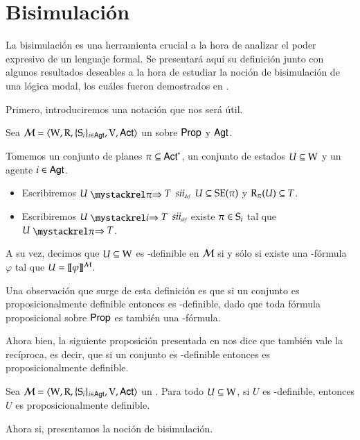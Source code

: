 \section{Bisimulación}

La bisimulación es una herramienta crucial a la hora de analizar el poder expresivo de un lenguaje formal. Se presentará aquí su definición junto con algunos resultados 
deseables a la hora de estudiar la noción de bisimulación de una lógica modal, los cuáles fueron demostrados en \cite{ArecesFSV25}.

Primero, introduciremos una notación que nos será útil.

\begin{definicion}
    Sea $\model=\tup{\W,\R,\cset{\S_i}_{i \in \AGT},\V,\ACT}$ un \ults sobre $\PROP$ y $\AGT$.

    Tomemos un conjunto de planes $\pi \subseteq \ACT^*$, un conjunto de estados $U \subseteq \W$ y un agente $i \in \AGT$.
    \begin{itemize}
        \item Escribiremos $U \ultsExecStrat{\pi} T$ $\iffdef$ $U \subseteq \sexec(\pi)$ y $\R_\pi(U) \subseteq T$.
        \item Escribiremos $U \ultsExecAgi T$ $\iffdef$ existe $\pi \in \S_i$ tal que $U \ultsExecStrat{\pi} T$.
    \end{itemize}
    A su vez, decimos que $U \subseteq \W$ es \KHilogic-definible en $\modults$ si y sólo si existe una \KHilogic-fórmula $\varphi$ tal que
    $U = \truthset{\modults}{\varphi}$.
\end{definicion}

Una observación que surge de esta definición es que si un conjunto es proposicionalmente definible entonces es \KHilogic-definible, dado que 
toda fórmula proposicional sobre $\PROP$ es también una \KHilogic-fórmula.

Ahora bien, la siguiente proposición presentada en \cite{ArecesFSV25} nos dice que también vale la recíproca, 
es decir, que si un conjunto es \KHilogic-definible entonces es proposicionalmente definible.

\begin{proposicion}\label{ref:khi_definable-implies-propositionally_definable}
    Sea $\model=\tup{\W,\R,\cset{\S_i}_{i \in \AGT},\V,\ACT}$ un \ults. Para todo $U \subseteq \W$, si $U$ es \KHilogic-definible, entonces $U$ es proposicionalmente definible.
\end{proposicion}

Ahora si, presentamos la noción de bisimulación.

